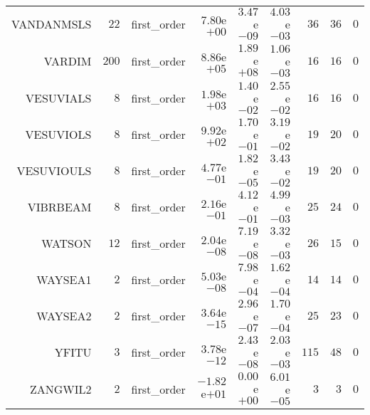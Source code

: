 \begin{longtable}{rrrrrrrrr}
VANDANMSLS & \(    22\) & first\_order & \( 7.80\)e\(+00\) & \( 3.47\)e\(-09\) & \( 4.03\)e\(-03\) & \(    36\) & \(    36\) & \(     0\) \\
VARDIM & \(   200\) & first\_order & \( 8.86\)e\(+05\) & \( 1.89\)e\(+08\) & \( 1.06\)e\(-03\) & \(    16\) & \(    16\) & \(     0\) \\
VESUVIALS & \(     8\) & first\_order & \( 1.98\)e\(+03\) & \( 1.40\)e\(-02\) & \( 2.55\)e\(-02\) & \(    16\) & \(    16\) & \(     0\) \\
VESUVIOLS & \(     8\) & first\_order & \( 9.92\)e\(+02\) & \( 1.70\)e\(-01\) & \( 3.19\)e\(-02\) & \(    19\) & \(    20\) & \(     0\) \\
VESUVIOULS & \(     8\) & first\_order & \( 4.77\)e\(-01\) & \( 1.82\)e\(-05\) & \( 3.43\)e\(-02\) & \(    19\) & \(    20\) & \(     0\) \\
VIBRBEAM & \(     8\) & first\_order & \( 2.16\)e\(-01\) & \( 4.12\)e\(-01\) & \( 4.99\)e\(-03\) & \(    25\) & \(    24\) & \(     0\) \\
WATSON & \(    12\) & first\_order & \( 2.04\)e\(-08\) & \( 7.19\)e\(-08\) & \( 3.32\)e\(-03\) & \(    26\) & \(    15\) & \(     0\) \\
WAYSEA1 & \(     2\) & first\_order & \( 5.03\)e\(-08\) & \( 7.98\)e\(-04\) & \( 1.62\)e\(-04\) & \(    14\) & \(    14\) & \(     0\) \\
WAYSEA2 & \(     2\) & first\_order & \( 3.64\)e\(-15\) & \( 2.96\)e\(-07\) & \( 1.70\)e\(-04\) & \(    25\) & \(    23\) & \(     0\) \\
YFITU & \(     3\) & first\_order & \( 3.78\)e\(-12\) & \( 2.43\)e\(-08\) & \( 2.03\)e\(-03\) & \(   115\) & \(    48\) & \(     0\) \\
ZANGWIL2 & \(     2\) & first\_order & \(-1.82\)e\(+01\) & \( 0.00\)e\(+00\) & \( 6.01\)e\(-05\) & \(     3\) & \(     3\) & \(     0\) \\\hline
\end{longtable}
